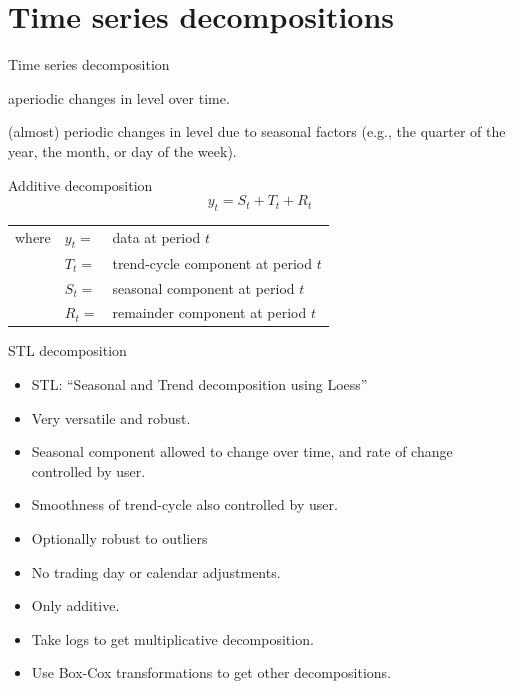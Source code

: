 \documentclass[
  14pt,
  ignorenonframetext,
  aspectratio=169,
]{beamer}
\providecommand{\tightlist}{%
  \setlength{\itemsep}{0pt}\setlength{\parskip}{0pt}}
\begin{document}
\section{Time series decompositions}\label{time-series-decompositions}

\begin{frame}{Time series decomposition}
\protect{}\label{time-series-decomposition}
\begin{description}
\tightlist
\item[Trend-Cycle]
aperiodic changes in level over time.
\item[Seasonal]
(almost) periodic changes in level due to seasonal factors (e.g., the
quarter of the year, the month, or day of the week).
\end{description}

\begin{block}{Additive decomposition}\vspace*{-0.3cm}
\[ y_t = S_t + T_t + R_t \]
\end{block}
\begin{tabular}{@{}llp{8cm}@{}}
where & $y_t=$ & data at period $t$ \\
      & $T_t=$ & trend-cycle component at period $t$\\
      & $S_t=$ & seasonal component at period $t$ \\
      & $R_t=$ & remainder component at period $t$
\end{tabular}
\end{frame}

\begin{frame}{STL decomposition}
\protect{}\label{stl-decomposition}
\fontsize{13}{14}\sf

\begin{itemize}
\tightlist
\item
  STL: ``Seasonal and Trend decomposition using Loess''
\item
  Very versatile and robust.
\item
  Seasonal component allowed to change over time, and rate of change
  controlled by user.
\item
  Smoothness of trend-cycle also controlled by user.
\item
  Optionally robust to outliers
\item
  No trading day or calendar adjustments.
\item
  Only additive.
\item
  Take logs to get multiplicative decomposition.
\item
  Use Box-Cox transformations to get other decompositions.
\end{itemize}
\end{frame}
\end{document}
